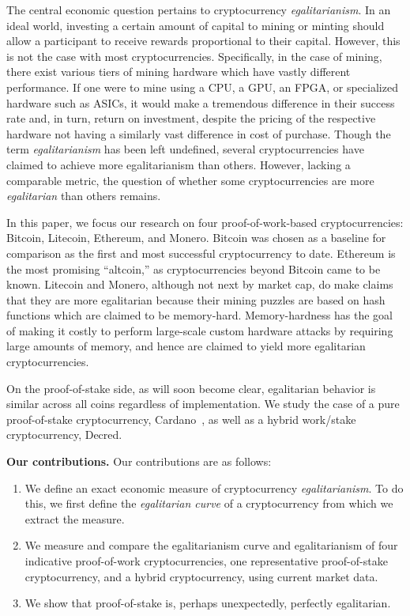 The central economic question pertains to cryptocurrency \emph{egalitarianism}.
In an ideal world, investing a certain amount of capital to mining or minting
should allow a participant to receive rewards proportional to their capital.
However, this is not the case with most cryptocurrencies. Specifically, in
the case of mining, there exist various tiers of mining hardware which have
vastly different performance. If one were to mine using a CPU, a GPU, an FPGA,
or specialized hardware such as ASICs, it would make a tremendous difference in
their success rate and, in turn, return on investment, despite the pricing of
the respective hardware not having a similarly vast difference in cost of
purchase. Though the term \emph{egalitarianism} has been left undefined, several
cryptocurrencies have claimed to achieve more egalitarianism than others.
However, lacking a comparable metric, the question of whether some
cryptocurrencies are more \emph{egalitarian} than others remains.

In this paper, we focus our research on four proof-of-work-based
cryptocurrencies: Bitcoin, Litecoin, Ethereum, and Monero. Bitcoin was chosen as
a baseline for comparison as the first and most successful cryptocurrency to
date. Ethereum is the most promising ``altcoin,'' as cryptocurrencies beyond
Bitcoin came to be known. Litecoin and Monero, although not next by market cap,
do make claims that they are more egalitarian because their mining puzzles are
based on hash functions which are claimed to be memory-hard. Memory-hardness
has the goal of making it costly to perform large-scale custom hardware attacks
by requiring large amounts of memory, and hence are claimed to yield more
egalitarian cryptocurrencies.

On the proof-of-stake side, as will soon become clear, egalitarian behavior is
similar across all coins regardless of implementation. We study the case of a
pure proof-of-stake cryptocurrency, Cardano~\cite{C:KRDO17}, as well as a hybrid
work/stake cryptocurrency, Decred.

\noindent
\textbf{Our contributions.}
Our contributions are as follows:

\begin{enumerate}
  \item We define an exact economic measure of cryptocurrency
        \emph{egalitarianism}.
        To do this, we first define the \emph{egalitarian curve} of a
        cryptocurrency from which we extract the measure.
  \item We measure and compare the egalitarianism curve and egalitarianism of
        four indicative proof-of-work cryptocurrencies, one representative
        proof-of-stake cryptocurrency, and a hybrid cryptocurrency, using
        current market data.
  \item We show that proof-of-stake is, perhaps unexpectedly, perfectly
        egalitarian.
\end{enumerate}

